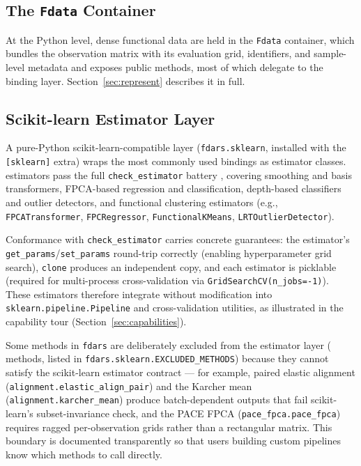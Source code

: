 \subsection{The \texttt{Fdata} Container}
\label{subsec:fdata}

At the Python level, dense functional data are held in the \texttt{Fdata}
container, which bundles the observation matrix with its evaluation grid,
identifiers, and sample-level metadata and exposes \nfdata{} public methods,
most of which delegate to the binding layer.  Section~\ref{sec:represent} describes it in
full.

\subsection{Scikit-learn Estimator Layer}
\label{subsec:sklearn}

A pure-Python scikit-learn-compatible layer (\texttt{fdars.sklearn}, installed
with the \texttt{[sklearn]} extra) wraps the most commonly used bindings as
estimator classes.  \nsklearnestimators{}
estimators pass the full \texttt{check\_estimator} battery
\citep{pedregosa_sklearn_2011}, covering smoothing and basis transformers,
FPCA-based regression and classification, depth-based classifiers and outlier
detectors, and functional clustering estimators (e.g., \texttt{FPCATransformer},
\texttt{FPCRegressor}, \texttt{FunctionalKMeans}, \texttt{LRTOutlierDetector}).

Conformance with \texttt{check\_estimator} carries concrete guarantees: the
estimator's \texttt{get\_params}/\texttt{set\_params} round-trip correctly
(enabling hyperparameter grid search), \texttt{clone} produces an independent
copy, and each estimator is picklable (required for multi-process cross-validation
via \texttt{GridSearchCV(n\_jobs=-1)}).  These estimators therefore integrate
without modification into \texttt{sklearn.pipeline.Pipeline} and
cross-validation utilities, as illustrated in the capability tour
(Section~\ref{sec:capabilities}).

Some methods in \texttt{fdars} are deliberately excluded from the estimator
layer (\nexcludedmethods{} methods, listed in \texttt{fdars.sklearn.EXCLUDED\_METHODS})
because they cannot satisfy the scikit-learn estimator contract --- for
example, paired elastic alignment
(\texttt{alignment.elastic\_align\_pair}) and the Karcher mean
(\texttt{alignment.karcher\_mean}) produce batch-dependent outputs that fail
scikit-learn's subset-invariance check, and the PACE FPCA
(\texttt{pace\_fpca.pace\_fpca}) requires ragged per-observation grids
rather than a rectangular matrix.  This boundary is documented transparently
so that users building custom pipelines know which methods to call directly.
